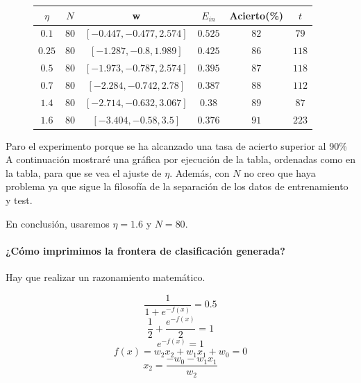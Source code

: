 \documentclass{article}
\begin{document}
    \begin{figure}[h]
        \centering
        \begin{tabular}{ |c|c|c|c|c|c| }
            \hline
            $\eta$ & $N$ & \textbf{w} & $E_{in}$ & Acierto(\%) & $t$ \\
            \hline
            $0.1$ & $80$ & $[-0.447, -0.477, 2.574]$ & $0.525$ & $82$ & $79$ \\
            \hline
            $0.25$ & $80$ & $[-1.287, -0.8, 1.989]$ & $0.425$ & $86$ & $118$ \\
            \hline
            $0.5$ & $80$ & $[-1.973, -0.787, 2.574]$ & $0.395$ & $87$ & $118$ \\
            \hline
            $0.7$ & $80$ & $[-2.284, -0.742, 2.78]$ & $0.387$ & $88$ & $112$ \\
            \hline
            $1.4$ & $80$ & $[-2.714, -0.632, 3.067]$ & $0.38$ & $89$ & $87$ \\
            \hline
            $1.6$ & $80$ & $[-3.404, -0.58, 3.5]$ & $0.376$ & $91$ & $223$ \\
            \hline
        \end{tabular}
    \end{figure}

    Paro el experimento porque se ha alcanzado una tasa de acierto superior al 90\%
    A continuación mostraré una gráfica por ejecución de la tabla, ordenadas como en la tabla, 
    para que se vea el ajuste de $\eta$. Además, con $N$ no creo que haya problema ya que sigue
    la filosofía de la separación de los datos de entrenamiento y test.

    En conclusión, usaremos $\eta = 1.6$ y $N = 80$.

    \paragraph*{¿Cómo imprimimos la frontera de clasificación generada?}
    Hay que realizar un razonamiento matemático.

    \begin{equation*}
        \frac{1}{1 + e^{-f(x)}} = 0.5
    \end{equation*}
    \begin{equation*}
        \frac{1}{2} + \frac{e^{-f(x)}}{2} = 1
    \end{equation*}
    \begin{equation*}
        e^{-f(x)} = 1
    \end{equation*}
    \begin{equation*}
        f(x) = w_2x_2 + w_1x_1 + w_0 = 0
    \end{equation*}
    \begin{equation*}
        x_2 = \frac{-w_0 - w_1x_1}{w_2}
    \end{equation*}
\end{document}
